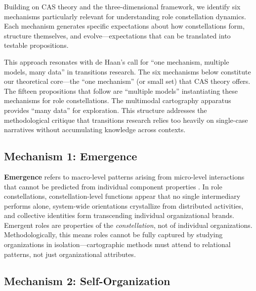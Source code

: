\documentclass[../main.tex]{subfiles}
\begin{document}
Building on CAS theory and the three-dimensional framework, we identify six mechanisms particularly relevant for understanding role constellation dynamics. Each mechanism generates specific expectations about how constellations form, structure themselves, and evolve---expectations that can be translated into testable propositions.

This approach resonates with de Haan's \cite{dehaan2025makingscience} call for ``one mechanism, multiple models, many data'' in transitions research. The six mechanisms below constitute our theoretical core---the ``one mechanism'' (or small set) that CAS theory offers. The fifteen propositions that follow are ``multiple models'' instantiating these mechanisms for role constellations. The multimodal cartography apparatus provides ``many data'' for exploration. This structure addresses the methodological critique that transitions research relies too heavily on single-case narratives without accumulating knowledge across contexts.

\subsection{Mechanism 1: Emergence}

\textbf{Emergence} refers to macro-level patterns arising from micro-level interactions that cannot be predicted from individual component properties \cite{holland1995hidden}. In role constellations, constellation-level functions appear that no single intermediary performs alone, system-wide orientations crystallize from distributed activities, and collective identities form transcending individual organizational brands. Emergent roles are properties of the \emph{constellation}, not of individual organizations. Methodologically, this means roles cannot be fully captured by studying organizations in isolation---cartographic methods must attend to relational patterns, not just organizational attributes.

\subsection{Mechanism 2: Self-Organization}
\end{document}
